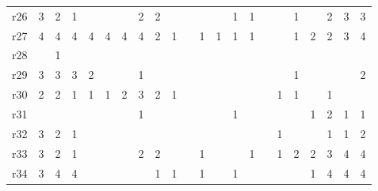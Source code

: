 {\begin{tabular}{l*{21}{r}}
r26& \cellcolor{magenta!10} 3& \cellcolor{magenta!10} 2& \cellcolor{magenta!10} 1& & & & \cellcolor{magenta!10} 2& \cellcolor{magenta!10} 2& & & & & \cellcolor{magenta!10} 1& \cellcolor{magenta!10} 1& & & \cellcolor{magenta!10} 1& & \cellcolor{magenta!10} 2& \cellcolor{magenta!10} 3& \cellcolor{magenta!10} 3\\ 
r27& \cellcolor{white} 4& \cellcolor{white} 4& \cellcolor{white} 4& \cellcolor{white} 4& \cellcolor{white} 4& \cellcolor{white} 4& \cellcolor{white} 4& \cellcolor{cyan!10} 2& \cellcolor{cyan!10} 1& & \cellcolor{cyan!10} 1& \cellcolor{cyan!10} 1& \cellcolor{cyan!10} 1& \cellcolor{cyan!10} 1& & & \cellcolor{cyan!10} 1& \cellcolor{cyan!10} 2& \cellcolor{cyan!10} 2& \cellcolor{cyan!10} 3& \cellcolor{white} 4\\ 
r28& & \cellcolor{cyan!10} 1& & & & & & & & & & & & & & & & & & & \\ 
r29& \cellcolor{white} 3& \cellcolor{white} 3& \cellcolor{white} 3& \cellcolor{cyan!10} 2& & & \cellcolor{cyan!10} 1& & & & & & & & & & \cellcolor{cyan!10} 1& & & & \cellcolor{cyan!10} 2\\ 
r30& \cellcolor{cyan!10} 2& \cellcolor{cyan!10} 2& \cellcolor{cyan!10} 1& \cellcolor{cyan!10} 1& \cellcolor{cyan!10} 1& \cellcolor{cyan!10} 2& \cellcolor{white} 3& \cellcolor{cyan!10} 2& \cellcolor{cyan!10} 1& & & & & & & \cellcolor{cyan!10} 1& \cellcolor{cyan!10} 1& & \cellcolor{cyan!10} 1& & \\ 
r31& & & & & & & \cellcolor{cyan!10} 1& & & & & & \cellcolor{cyan!10} 1& & & & & \cellcolor{cyan!10} 1& \cellcolor{white} 2& \cellcolor{cyan!10} 1& \cellcolor{cyan!10} 1\\ 
r32& \cellcolor{cyan!10} 3& \cellcolor{cyan!10} 2& \cellcolor{cyan!10} 1& & & & & & & & & & & & & \cellcolor{cyan!10} 1& & & \cellcolor{cyan!10} 1& \cellcolor{cyan!10} 1& \cellcolor{cyan!10} 2\\ 
r33& \cellcolor{magenta!10} 3& \cellcolor{magenta!10} 2& \cellcolor{magenta!10} 1& & & & \cellcolor{magenta!10} 2& \cellcolor{magenta!10} 2& & & \cellcolor{magenta!10} 1& & & \cellcolor{magenta!10} 1& & \cellcolor{magenta!10} 1& \cellcolor{magenta!10} 2& \cellcolor{magenta!10} 2& \cellcolor{magenta!10} 3& \cellcolor{white} 4& \cellcolor{white} 4\\ 
r34& \cellcolor{cyan!10} 3& \cellcolor{white} 4& \cellcolor{white} 4& & & & & \cellcolor{cyan!10} 1& \cellcolor{cyan!10} 1& & \cellcolor{cyan!10} 1& & \cellcolor{cyan!10} 1& & & & & \cellcolor{cyan!10} 1& \cellcolor{white} 4& \cellcolor{white} 4& \cellcolor{white} 4\\ 

\end{tabular}}
